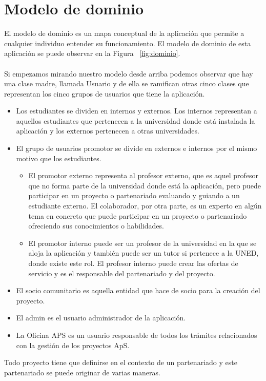 \documentclass[11pt]{book}
\begin{document}
	\section{Modelo de dominio}
	El modelo de dominio es un mapa conceptual de la aplicación que permite a cualquier individuo entender su funcionamiento. El modelo de dominio de esta aplicación se puede observar en la Figura ~\ref{fig:dominio}.\\\\
	Si empezamos mirando nuestro modelo desde arriba podemos observar que hay una clase madre, llamada Usuario y de ella se ramifican otras cinco clases que representan los cinco grupos de usuarios que tiene la aplicación.\\
	\begin{itemize} 
		\item Los estudiantes se dividen en internos y externos. Los internos representan a aquellos estudiantes que pertenecen a la universidad donde está instalada la aplicación y los externos pertenecen a otras universidades.
		\item El grupo de usuarios promotor se divide en externos e internos por el mismo motivo que los estudiantes. 
		\begin{itemize} 
			\item El promotor externo representa al profesor externo, que es aquel profesor que no forma parte de la universidad donde está la aplicación, pero puede participar en un proyecto o partenariado evaluando y guiando a un estudiante externo. El colaborador, por otra parte, es un experto en algún tema en concreto que puede participar en un proyecto o partenariado ofreciendo sus conocimientos o habilidades. 
			\item El promotor interno puede ser un profesor de la universidad en la que se aloja la aplicación y también puede ser un tutor si pertenece a la UNED, donde existe este rol. El profesor interno puede crear las ofertas de servicio y es el responsable del partenariado y del proyecto.
		\end{itemize}
		\item El socio comunitario es aquella entidad que hace de socio para la creación del proyecto.
		\item El admin es el usuario administrador de la aplicación.
		\item La Oficina APS es un usuario responsable de todos los trámites relacionados con la gestión de los proyectos ApS. 
	\end{itemize}
	Todo proyecto tiene que definirse en el contexto de un partenariado y este partenariado se puede originar de varias maneras. \\
\end{document}

